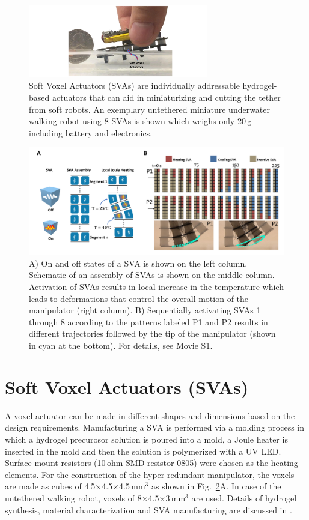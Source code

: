 \begin{figure}[!t]
\centering
\includegraphics[width=0.7\textwidth]{Fig1.pdf}
    \caption{Soft Voxel Actuators (SVAs) are individually addressable hydrogel-based actuators that can aid in miniaturizing and cutting the tether from soft robots. 
    An exemplary untethered miniature underwater walking robot using 8 SVAs is shown which weighs only 20\,g including battery and electronics.}
    \label{fig:concept}
\end{figure}
\begin{figure}[!t]
      \centering
      \includegraphics[width=\textwidth]{Fig2.pdf}
      \caption{A) On and off states of a SVA is shown on the left column. Schematic of an assembly of SVAs is shown on the middle column. Activation of SVAs results in local increase in the temperature which leads to deformations that control the overall motion of the manipulator (right column). B) Sequentially activating SVAs 1 through 8 according to the patterns labeled P1 and P2 results in different trajectories followed by the tip of the manipulator (shown in cyan at the bottom). For details, see Movie S1.}
      \label{fig:treajectory}
   \end{figure}
	
\section{Soft Voxel Actuators (SVAs)}
A voxel actuator can be made in different shapes and dimensions based on the design requirements. Manufacturing a SVA is performed via a molding process in which a hydrogel precurosor solution is poured into a mold, a Joule heater is inserted in the mold and then the solution is polymerized with a UV LED. Surface  mount  resistors  (10\,ohm  SMD  resistor  0805) were chosen as the heating elements. For the construction of the hyper-redundant manipulator, the voxels are made as cubes of 4.5$\times$4.5$\times$4.5\,mm$^3$ as shown in Fig.~\ref{fig:treajectory}A. In case of the untethered walking robot, voxels of 8$\times$4.5$\times$3\,mm$^3$ are used. Details of hydrogel synthesis, material characterization and SVA manufacturing are discussed in \cite{khodambashi2021}.

